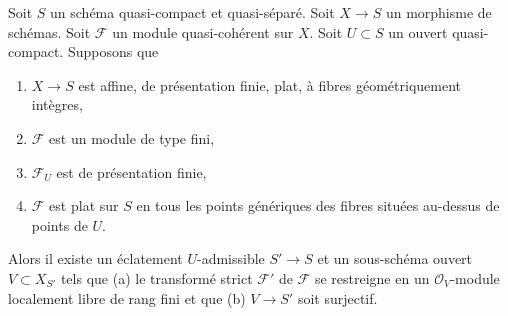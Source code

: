 \begin{lemma}
\label{lemma-flatten-module-pre}
Soit $S$ un schéma quasi-compact et quasi-séparé.
Soit $X \to S$ un morphisme de schémas.
Soit $\mathcal{F}$ un module quasi-cohérent sur $X$.
Soit $U \subset S$ un ouvert quasi-compact. Supposons que
\begin{enumerate}
\item $X \to S$ est affine, de présentation finie, plat, à
fibres géométriquement intègres,
\item $\mathcal{F}$ est un module de type fini,
\item $\mathcal{F}_U$ est de présentation finie,
\item $\mathcal{F}$ est plat sur $S$ en tous les points génériques des
fibres situées au-dessus de points de $U$.
\end{enumerate}
Alors il existe un éclatement $U$-admissible $S' \to S$
et un sous-schéma ouvert $V \subset X_{S'}$
tels que (a) le transformé strict $\mathcal{F}'$ de $\mathcal{F}$
se restreigne en un $\mathcal{O}_V$-module localement libre de rang fini et que
(b) $V \to S'$ soit surjectif.
\end{lemma}

